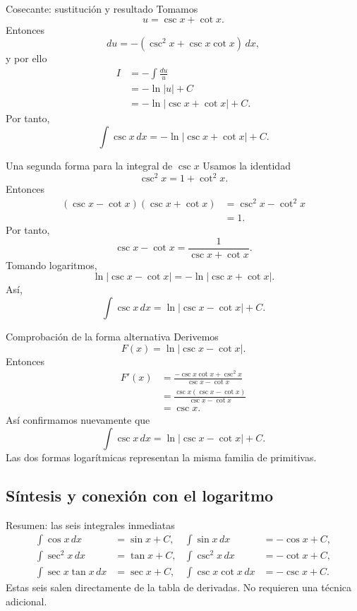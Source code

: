 \documentclass[10pt,aspectratio=169]{beamer}
\begin{document}
\begin{frame}{Cosecante: sustitución y resultado}
Tomamos
\[
\boxed{u=\csc x+\cot x}.
\]
Entonces
\[
du=-(\csc^2x+\csc x\cot x)\,dx,
\]
y por ello
\begin{align*}
I
&=-\int\frac{du}{u}\\
&=-\ln|u|+C\\
&=\boxed{-\ln|\csc x+\cot x|+C}.
\end{align*}
Por tanto,
\[
\boxed{\int\csc x\,dx=-\ln|\csc x+\cot x|+C.}
\]
\end{frame}

\begin{frame}{Una segunda forma para la integral de $\csc x$}
Usamos la identidad
\[
\csc^2x=1+\cot^2x.
\]
Entonces
\begin{align*}
(\csc x-\cot x)(\csc x+\cot x)
&=\csc^2x-\cot^2x\\
&=1.
\end{align*}
Por tanto,
\[
\csc x-\cot x=\frac{1}{\csc x+\cot x}.
\]
Tomando logaritmos,
\[
\ln|\csc x-\cot x|=-\ln|\csc x+\cot x|.
\]
Así,
\[
\boxed{\int\csc x\,dx=\ln|\csc x-\cot x|+C.}
\]
\end{frame}

\begin{frame}{Comprobación de la forma alternativa}
Derivemos
\[
F(x)=\ln|\csc x-\cot x|.
\]
Entonces
\small
\begin{align*}
F'(x)
&=\frac{-\csc x\cot x+\csc^2x}{\csc x-\cot x}\\
&=\frac{\csc x(\csc x-\cot x)}{\csc x-\cot x}\\
&=\csc x.
\end{align*}
Así confirmamos nuevamente que
\[
\int\csc x\,dx=\ln|\csc x-\cot x|+C.
\]
Las dos formas logarítmicas representan la misma familia de primitivas.
\end{frame}

\subsection{Síntesis y conexión con el logaritmo}
\begin{frame}{Resumen: las seis integrales inmediatas}
\footnotesize
\[
\boxed{
\begin{aligned}
\int\cos x\,dx&=\sin x+C,
&\int\sin x\,dx&=-\cos x+C,\\[1mm]
\int\sec^2x\,dx&=\tan x+C,
&\int\csc^2x\,dx&=-\cot x+C,\\[1mm]
\int\sec x\tan x\,dx&=\sec x+C,
&\int\csc x\cot x\,dx&=-\csc x+C.
\end{aligned}}
\]
Estas seis salen directamente de la tabla de derivadas. No requieren una técnica adicional.
\end{frame}
\end{document}
